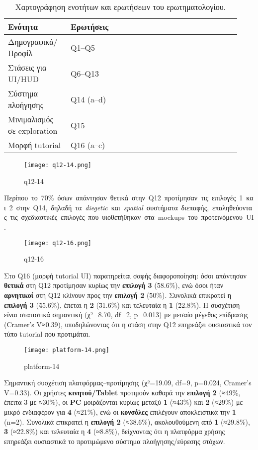 \begin{table}[H]
\centering
\begin{tabular}{p{0.25\linewidth} p{0.68\linewidth}}
\toprule
\textbf{Ενότητα} & \textbf{Ερωτήσεις} \\
\midrule
Δημογραφικά/Προφίλ & Q1--Q5 \\
Στάσεις για UI/HUD & Q6--Q13 \\
Σύστημα πλοήγησης & Q14 (a--d) \\
Μινιμαλισμός σε exploration & Q15 \\
Μορφή tutorial & Q16 (a--c) \\
\bottomrule
\end{tabular}
\caption{Χαρτογράφηση ενοτήτων και ερωτήσεων του ερωτηματολογίου.}
\label{tab:survey_map}
\end{table}



\begin{figure}[H]
    \centering
    \texttt{[image: q12-14.png]}
    \caption{q12-14}
    \label{fig:placeholder}
\end{figure}


Περίπου~το~70\%~όσων~απάντησαν~θετικά~στην~Q12~προτίμησαν~τις~επιλογές~1~και~2~στην~Q14,~δηλαδή~τα~\textit{diegetic}~και~\textit{spatial}~συστήματα~διεπαφής,~επαληθεύοντας~τις~σχεδιαστικές~επιλογές~που~υιοθετήθηκαν~στα~mockups~του~προτεινόμενου~UI.

\begin{figure}[H]
    \centering
    \texttt{[image: q12-16.png]}
    \caption{q12-16}
    \label{fig:placeholder}
\end{figure}
Στο Q16 (μορφή tutorial UI) παρατηρείται σαφής διαφοροποίηση: όσοι απάντησαν \textbf{θετικά} στη Q12 προτίμησαν κυρίως την \textbf{επιλογή 3} (\~58.6\%), ενώ όσοι ήταν \textbf{αρνητικοί} στη Q12 κλίνουν προς την \textbf{επιλογή 2} (\~50\%). Συνολικά επικρατεί η \textbf{επιλογή 3} (\~45.6\%), έπεται η \textbf{2} (\~31.6\%) και τελευταία η \textbf{1} (\~22.8\%). Η συσχέτιση είναι στατιστικά σημαντική (χ²=8.70, df=2, p=0.013) με μεσαίο μέγεθος επίδρασης (Cramer's V≈0.39), υποδηλώνοντας ότι η στάση στην Q12 επηρεάζει ουσιαστικά τον τύπο tutorial που προτιμάται. 

\begin{figure}[H]
    \centering
    \texttt{[image: platform-14.png]}
    \caption{platform-14}
    \label{fig:placeholder}
\end{figure}

Σημαντική συσχέτιση πλατφόρμας–προτίμησης (χ²=19.09, df=9, p=0.024, Cramer’s V=0.33). Οι χρήστες \textbf{κινητού/Tablet} προτιμούν καθαρά την \textbf{επιλογή 2} (≈49\%, έπειτα 3 με ≈30\%), οι \textbf{PC} μοιράζονται κυρίως μεταξύ \textbf{1} (≈43\%) και \textbf{2} (≈29\%) με μικρό ενδιαφέρον για \textbf{4} (≈21\%), ενώ οι \textbf{κονσόλες} επιλέγουν αποκλειστικά την \textbf{1} (n=2). Συνολικά επικρατεί η \textbf{επιλογή 2} (≈38.6\%), ακολουθούμενη από \textbf{1} (≈29.8\%), \textbf{3} (≈22.8\%) και τελευταία η \textbf{4} (≈8.8\%), δείχνοντας ότι η πλατφόρμα χρήσης επηρεάζει ουσιαστικά το προτιμώμενο σύστημα πλοήγησης/εύρεσης στόχων. 

